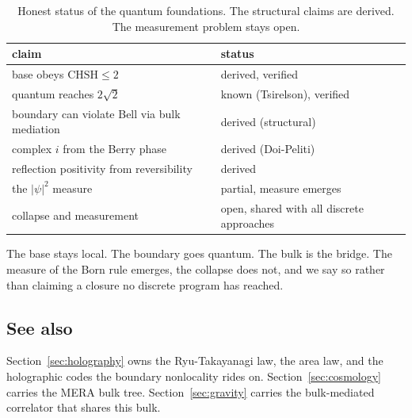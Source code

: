 \begin{table}[ht]
\centering
\begin{tabular}{@{}ll@{}}
\toprule
claim & status \\
\midrule
base obeys $\mathrm{CHSH} \le 2$ & derived, verified \\
quantum reaches $2\sqrt{2}$ & known (Tsirelson), verified \\
boundary can violate Bell via bulk mediation & derived (structural) \\
complex $i$ from the Berry phase & derived (Doi-Peliti) \\
reflection positivity from reversibility & derived \\
the $|\psi|^2$ measure & partial, measure emerges \\
collapse and measurement & open, shared with all discrete approaches \\
\bottomrule
\end{tabular}
\caption{Honest status of the quantum foundations. The structural claims are derived. The measurement problem stays open.}
\label{tab:quantum-status}
\end{table}

\begin{result}
The base stays local. The boundary goes quantum. The bulk is the bridge. The measure of the Born rule emerges, the collapse does not, and we say so rather than claiming a closure no discrete program has reached.
\end{result}

\subsection{See also}

Section~\ref{sec:holography} owns the Ryu-Takayanagi law, the area law, and the holographic codes the boundary nonlocality rides on. Section~\ref{sec:cosmology} carries the MERA bulk tree. Section~\ref{sec:gravity} carries the bulk-mediated correlator that shares this bulk.
